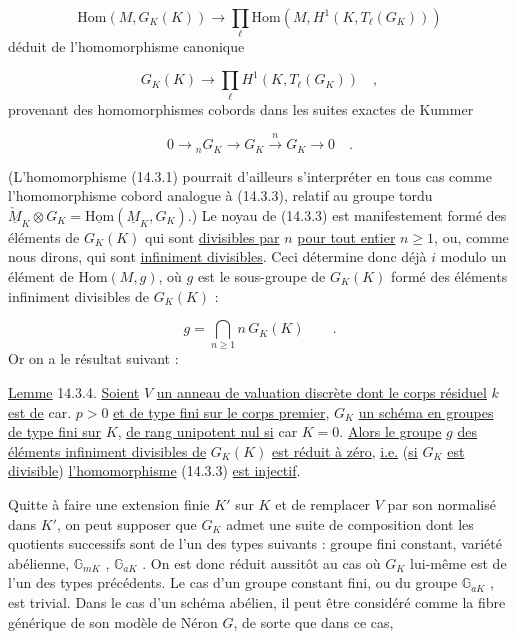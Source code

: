 \begin{equation}\tag{14.3.2}
\mathrm{Hom}(M, G_K(K)) \longrightarrow \prod_\ell \mathrm{Hom}(M, H^1(K, T_\ell(G_K)))
\end{equation}
déduit de l'homomorphisme canonique

\begin{equation}\tag{14.3.3}
G_K(K) \longrightarrow \prod_\ell H^1(K, T_\ell(G_K)) \quad ,
\end{equation}
provenant des homomorphismes cobords dans les suites exactes de Kummer

\begin{equation*}
0 \longrightarrow {}_n G_K \longrightarrow G_K \xrightarrow{\; n \;} G_K \longrightarrow 0 \quad .
\end{equation*}


(L'homomorphisme (14.3.1) pourrait d'ailleurs s'interpréter en tous cas comme l'homomorphisme cobord analogue à (14.3.3), relatif au groupe tordu $\check{\underline{M}}_K \otimes G_K = \underline{\mathrm{Hom}}(\underline{M}_K , G_K)$.) Le noyau de (14.3.3) est manifestement formé des éléments de $G_K(K)$ qui sont \underline{divisibles par} $n$ \underline{pour tout entier} $n \geq 1$, ou, comme nous dirons, qui sont \underline{infiniment divisibles}. Ceci détermine donc déjà $i$ modulo un élément de $\mathrm{Hom}(M,g)$, où $g$ est le sous-groupe de $G_K(K)$ formé des éléments infiniment divisibles de $G_K(K)$ :

\begin{equation*}
g = \bigcap_{n \geq 1} n\, G_K(K) \qquad .
\end{equation*}
Or on a le résultat suivant :

\underline{Lemme} 14.3.4. \underline{Soient} $V$ \underline{un anneau de valuation discrète dont le corps résiduel} $k$ \underline{est de} car. $p > 0$ \underline{et de type fini sur le corps premier}, $G_K$ \underline{un schéma en groupes de type fini sur} $K$, \underline{de rang unipotent nul si} car $K = 0$. \underline{Alors le groupe} $g$ \underline{des éléments infiniment divisibles de} $G_K(K)$ \underline{est réduit à zéro}, \underline{i.e.} (\underline{si} $G_K$ \underline{est divisible}) \underline{l'homomorphisme} (14.3.3) \underline{est injectif}.

Quitte à faire une extension finie $K'$ sur $K$ et de remplacer $V$ par son normalisé dans $K'$, on peut supposer que $G_K$ admet une suite de composition dont les quotients successifs sont de l'un des types suivants : groupe fini constant, variété abélienne, $\mathbb{G}_{mK}$ , $\mathbb{G}_{aK}$ . On est donc réduit aussitôt au cas où $G_K$ lui-même est de l'un des types précédents. Le cas d'un groupe constant fini, ou du groupe $\mathbb{G}_{aK}$ , est trivial. Dans le cas d'un schéma abélien, il peut être considéré comme la fibre générique de son modèle de Néron $G$, de sorte que dans ce cas,


